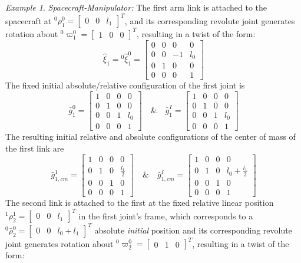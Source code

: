 \documentclass[lettersize,journal]{IEEEtran}
\theoremstyle{remark}
\newtheorem{example}{Example}[subsection]
\begin{document}
\begin{example}{\textit{Spacecraft-Manipulator:}}
The first arm link is attached to the spacecraft at $^0\rho^0_1=\begin{bmatrix}0 & 0 &l_1\end{bmatrix}^T$, and its corresponding revolute joint generates rotation about $^0\varpi^0_1=\begin{bmatrix} 1 & 0 & 0\end{bmatrix}^T$, resulting in a twist of the form:
\begin{equation*}
    \hat{\xi}_1={}^0\hat{\xi}^0_1=\begin{bmatrix}0 &0 &0&0 \\0 &0 &-1& l_0\\0 & 1& 0&0 \\0 & 0 & 0 & 1
    \end{bmatrix}
\end{equation*}
The fixed initial absolute/relative configuration of the first joint is
\begin{equation*}
    \bar{g}^0_1=\begin{bmatrix}1 &0 &0&0 \\0 &1 &0& 0\\0 & 0& 1& l_0 \\0 & 0 & 0 & 1
    \end{bmatrix} \quad \& \quad  \bar{g}^I_1=\begin{bmatrix}1 &0 &0&0 \\0 &1 &0& 0\\0 & 0& 1&l_0 \\0 & 0 & 0 & 1
    \end{bmatrix}
\end{equation*}
The resulting initial relative and absolute configurations of the center of mass of the first link are
\begin{equation*}
    \bar{g}^1_{1,cm}=\begin{bmatrix}1 &0 &0&0 \\0 &1 &0& \frac{l_1}{2}\\0 & 0& 1&0 \\0 & 0 & 0 & 1
    \end{bmatrix} \quad \& \quad  \bar{g}^I_{1,cm}=\begin{bmatrix}1 &0 &0&0 \\0 &1 &0& l_0+\frac{l_1}{2}\\0 & 0& 1&0 \\0 & 0 & 0 & 1
    \end{bmatrix}
\end{equation*}
The second link is attached to the first at the fixed relative linear position $^1\rho^1_2=\begin{bmatrix}0 & 0 &l_1\end{bmatrix}^T$ in the first joint's frame, which corresponds to a $ ^0\bar{\rho}^0_2=\begin{bmatrix}0 & 0 &l_0+l_1\end{bmatrix}^T$ absolute \textit{initial} position and its corresponding revolute joint generates rotation about $^0\varpi^0_2=\begin{bmatrix} 0 & 1 & 0\end{bmatrix}^T$, resulting in a twist of the form:

\end{example}
\end{document}
